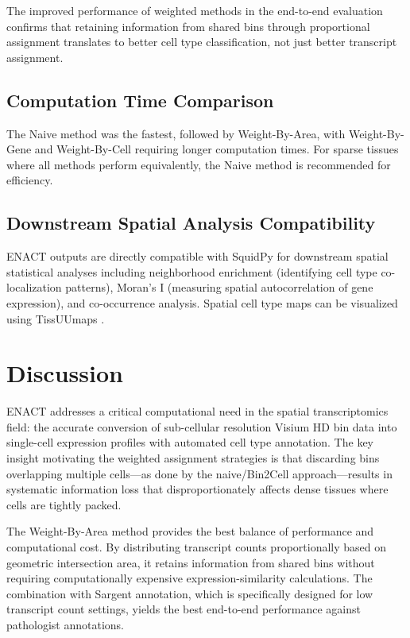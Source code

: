 \documentclass[11pt]{article}
\begin{document}
The improved performance of weighted methods in the end-to-end evaluation confirms that retaining information from shared bins through proportional assignment translates to better cell type classification, not just better transcript assignment.

\subsection{Computation Time Comparison}

The Naive method was the fastest, followed by Weight-By-Area, with Weight-By-Gene and Weight-By-Cell requiring longer computation times. For sparse tissues where all methods perform equivalently, the Naive method is recommended for efficiency.

\subsection{Downstream Spatial Analysis Compatibility}

ENACT outputs are directly compatible with SquidPy \citep{palla2022squidpy} for downstream spatial statistical analyses including neighborhood enrichment (identifying cell type co-localization patterns), Moran's I (measuring spatial autocorrelation of gene expression), and co-occurrence analysis. Spatial cell type maps can be visualized using TissUUmaps \citep{solorzano2024tissuumaps}.

\section{Discussion}

ENACT addresses a critical computational need in the spatial transcriptomics field: the accurate conversion of sub-cellular resolution Visium HD bin data into single-cell expression profiles with automated cell type annotation. The key insight motivating the weighted assignment strategies is that discarding bins overlapping multiple cells---as done by the naive/Bin2Cell approach---results in systematic information loss that disproportionately affects dense tissues where cells are tightly packed.

The Weight-By-Area method provides the best balance of performance and computational cost. By distributing transcript counts proportionally based on geometric intersection area, it retains information from shared bins without requiring computationally expensive expression-similarity calculations. The combination with Sargent annotation, which is specifically designed for low transcript count settings, yields the best end-to-end performance against pathologist annotations.
\end{document}
